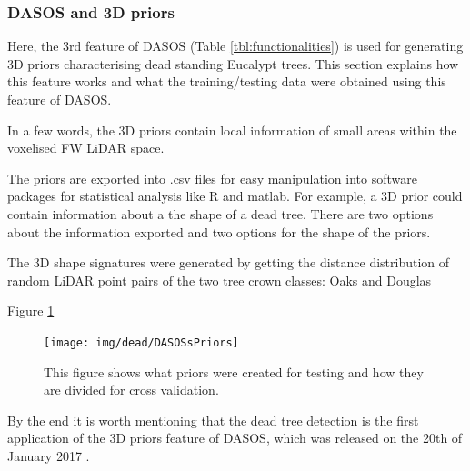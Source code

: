 \documentclass{subfiles}
\begin{document}
\subsubsection{DASOS and 3D priors}

\par Here, the 3rd feature of DASOS (Table \ref{tbl:functionalities}) is used for generating 3D priors characterising dead standing Eucalypt trees.  This section explains how this feature works and what the training/testing data were obtained using this feature of DASOS. 

\par  In a few words, the 3D priors contain local information of small areas within the voxelised FW LiDAR space. 

The priors are exported into .csv files for easy manipulation into software packages for statistical analysis like R and matlab. For example, a 3D prior could contain information about a the shape of a dead tree. There are two options about the information exported and two options for the shape of the priors.  

The 3D shape signatures were generated by getting the distance distribution of random LiDAR point pairs of the two tree crown classes: Oaks and Douglas \cite{Dong2009}







\par Figure \ref{fig:DASOSsPriors}


\begin{figure} [h!]
	\centering
	\texttt{[image: img/dead/DASOSsPriors]}
	\caption{This figure shows what priors were created for testing and how they are divided for cross validation.}
	\label{fig:DASOSsPriors}
\end{figure}



\par By the end it is worth mentioning that the dead tree detection is the first application of the 3D priors feature of DASOS, which was released on the 20th of January 2017 \cite{DASOS_v2}. 
\end{document}
